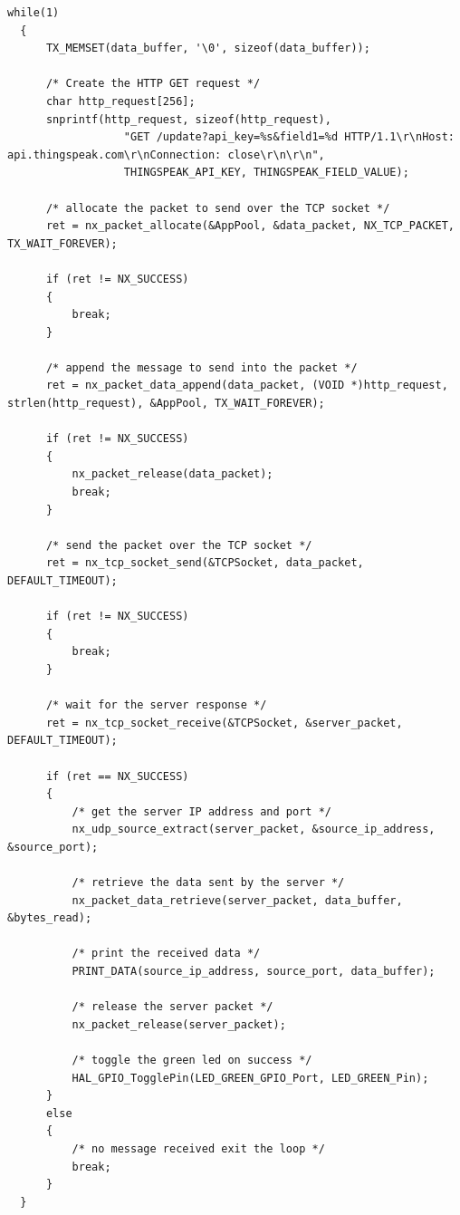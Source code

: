 \documentclass[10pt,a4paper,onecolumn]{article}
\begin{document}
\begin{lstlisting}[style=CStyle]
  while(1)
  {
      TX_MEMSET(data_buffer, '\0', sizeof(data_buffer));

      /* Create the HTTP GET request */
      char http_request[256];
      snprintf(http_request, sizeof(http_request),
                  "GET /update?api_key=%s&field1=%d HTTP/1.1\r\nHost: api.thingspeak.com\r\nConnection: close\r\n\r\n",
                  THINGSPEAK_API_KEY, THINGSPEAK_FIELD_VALUE);

      /* allocate the packet to send over the TCP socket */
      ret = nx_packet_allocate(&AppPool, &data_packet, NX_TCP_PACKET, TX_WAIT_FOREVER);

      if (ret != NX_SUCCESS)
      {
          break;
      }

      /* append the message to send into the packet */
      ret = nx_packet_data_append(data_packet, (VOID *)http_request, strlen(http_request), &AppPool, TX_WAIT_FOREVER);

      if (ret != NX_SUCCESS)
      {
          nx_packet_release(data_packet);
          break;
      }

      /* send the packet over the TCP socket */
      ret = nx_tcp_socket_send(&TCPSocket, data_packet, DEFAULT_TIMEOUT);

      if (ret != NX_SUCCESS)
      {
          break;
      }

      /* wait for the server response */
      ret = nx_tcp_socket_receive(&TCPSocket, &server_packet, DEFAULT_TIMEOUT);

      if (ret == NX_SUCCESS)
      {
          /* get the server IP address and port */
          nx_udp_source_extract(server_packet, &source_ip_address, &source_port);

          /* retrieve the data sent by the server */
          nx_packet_data_retrieve(server_packet, data_buffer, &bytes_read);

          /* print the received data */
          PRINT_DATA(source_ip_address, source_port, data_buffer);

          /* release the server packet */
          nx_packet_release(server_packet);

          /* toggle the green led on success */
          HAL_GPIO_TogglePin(LED_GREEN_GPIO_Port, LED_GREEN_Pin);
      }
      else
      {
          /* no message received exit the loop */
          break;
      }
  }
\end{lstlisting}
\end{document}

